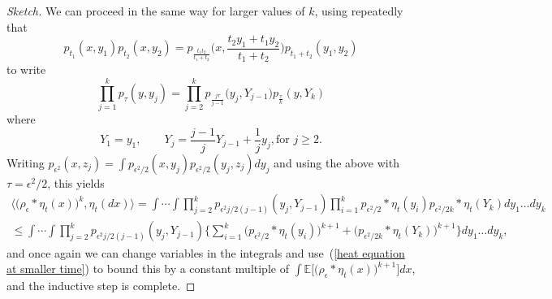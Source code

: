\documentclass[EJP]{ejpecp} %
\newcommand{\IE}{\mathbb E}
\begin{document}
\begin{proof}[Sketch]
We can proceed in the same way for larger values of $k$, using repeatedly that
\[
p_{t_1}(x,y_1)p_{t_2}(x,y_2)=p_{\frac{t_1t_2}{t_1+t_2}}
\Big(x,\frac{t_2y_1+t_1y_2}{t_1+t_2}\Big)p_{t_1+t_2}(y_1,y_2)
\]
to write 
\[
\prod_{j=1}^k p_{\tau}(y,y_j)
=\prod_{j=2}^{k}p_{\frac{j\tau}{j-1}}\big(y_j,Y_{j-1}\big)
p_{\frac{\tau}{k}}(y, Y_k)
\]
where
\[
    Y_1=y_1, \qquad Y_j=\frac{j-1}{j}Y_{j-1}+\frac{1}{j}y_j,  \mbox{for }j\geq 2.
\]
Writing $p_{\epsilon^2}(x,z_j) = \int p_{\epsilon^2/2}(x,y_j) p_{\epsilon^2/2}(y_j,z_j) dy_j$
and using the above with $\tau = \epsilon^2/2$,
this yields
\begin{multline*}
\big\langle\big(\rho_\epsilon*\eta_t(x)\big)^k,\eta_t(dx)\big\rangle
    =\int\cdots\int \prod_{j=2}^k p_{\epsilon^2 j/2(j-1)}(y_j,Y_{j-1})
     \prod_{i=1}^k p_{\epsilon^2/2}*\eta_t(y_i)p_{\epsilon^2/2k}*\eta_t(Y_k)
dy_1\ldots dy_k
\\
\leq
\int\cdots\int 
    \prod_{j=2}^k p_{\epsilon^2 j/2(j-1)}(y_j,Y_{j-1})
    \Big\{\sum_{i=1}^k\big(p_{\epsilon^2/2}*\eta_t(y_i)\big)^{k+1}
    + \big(p_{\epsilon^2/2k}*\eta_t(Y_k)\big)^{k+1}\Big\}dy_1\ldots dy_k,
\end{multline*}
and once again we can change variables in the integrals and 
use~(\ref{heat equation at smaller time}) to bound this by a constant 
multiple of $\int\IE\big[\big(\rho_\epsilon*\eta_t(x)\big)^{k+1}\big]dx$, and
the inductive step is complete.
\end{proof}
\end{document}
